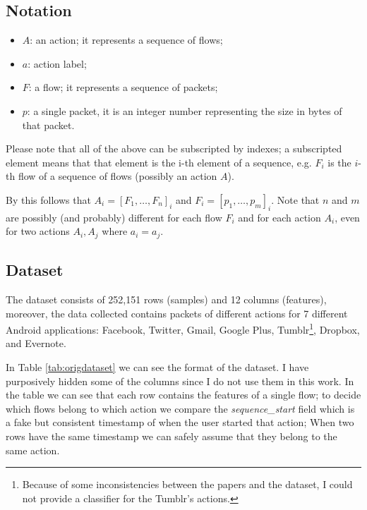 \subsection{Notation}
\label{subsec:notation}
\begin{itemize}
 \item $ A $: an action; it represents a sequence of flows;
 \item $ a $: action label;
 \item $ F $: a flow; it represents a sequence of packets;
 \item $ p $: a single packet, it is an integer number representing the size in bytes of that packet.
\end{itemize}

Please note that all of the above can be subscripted by indexes; a subscripted element means that that element is the i-th element of a sequence, e.g. $F_i$ is the $i$-th flow of a sequence of flows (possibly an action $A$).
 
By this follows that $A_i = [F_1, \dots, F_n]_i$ and $F_i = [p_1,\dots, p_m]_i$. Note that $n$ and $m$ are possibly (and probably) different for each flow $F_i$ and for each action $A_i$, even for two actions $A_i, A_j$ where $a_i = a_j$.

\subsection{Dataset}
The dataset consists of 252,151 rows (samples) and 12 columns (features), moreover, the data collected contains packets of different actions for 7 different Android applications: Facebook, Twitter, Gmail, Google Plus, Tumblr\footnote{Because of some inconsistencies between the papers and the dataset, I could not provide a classifier for the Tumblr's actions.}, Dropbox, and Evernote. 

In Table \ref{tab:origdataset} we can see the format of the dataset. I have purposively hidden some of the columns since I do not use them in this work. In the table we can see that each row contains the features of a single flow; to decide which flows belong to which action we compare the \textit{sequence\_start} field which is a fake but consistent timestamp of when the user started that action; When two rows have the same timestamp we can safely assume that they belong to the same action.


